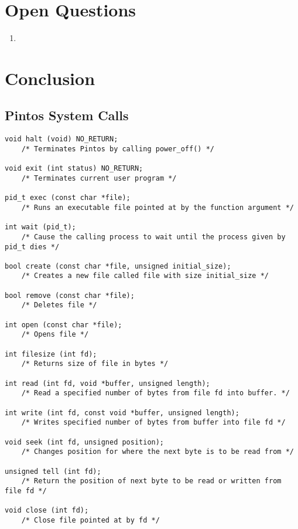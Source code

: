 \documentclass[11pt, letterpaper]{article}
\begin{document}
\section*{Open Questions}

\begin{enumerate}
\item 
\end{enumerate}



\section*{Conclusion}

\pagebreak
\begin{appendices}

\section{Pintos System Calls}
\begin{lstlisting}[frame=single,basicstyle=\footnotesize]
void halt (void) NO_RETURN;
	/* Terminates Pintos by calling power_off() */
	
void exit (int status) NO_RETURN;
	/* Terminates current user program */

pid_t exec (const char *file);
	/* Runs an executable file pointed at by the function argument */

int wait (pid_t);
	/* Cause the calling process to wait until the process given by pid_t dies */

bool create (const char *file, unsigned initial_size);
	/* Creates a new file called file with size initial_size */

bool remove (const char *file);
	/* Deletes file */

int open (const char *file);
	/* Opens file */

int filesize (int fd);
	/* Returns size of file in bytes */

int read (int fd, void *buffer, unsigned length);
	/* Read a specified number of bytes from file fd into buffer. */

int write (int fd, const void *buffer, unsigned length);
	/* Writes specified number of bytes from buffer into file fd */

void seek (int fd, unsigned position);
	/* Changes position for where the next byte is to be read from */

unsigned tell (int fd);
	/* Return the position of next byte to be read or written from file fd */

void close (int fd);
	/* Close file pointed at by fd */

\end{lstlisting}

\pagebreak

%

\end{appendices}
\end{document}
